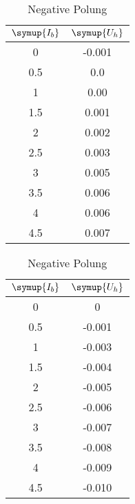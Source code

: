 \vspace{-2cm}

  \begin{table}[!ht]
    \caption*{\textbf{Hallspannung; Strom $\symup{I_q}$ konstant}}
    \begin{minipage}{0.49\textwidth}
          \centering  
          \caption{Positive Polung}
          \label{tab:bconst}
          \begin{tabular}{c c}
            \toprule
            $\symup{I_b}$ & $\symup{U_h}$ \\
            \midrule
             0   & -0.001 \\
             0.5 &  0.0 \\
             1   &  0.00 \\
             1.5 &  0.001 \\
             2   &  0.002 \\
             2.5 &  0.003 \\
             3   &  0.005 \\
             3.5 &  0.006 \\
             4   &  0.006 \\
             4.5 &  0.007 \\
            \bottomrule
        \end{tabular}
    \end{minipage}
    \hfill
    \begin{minipage}{0.49\textwidth}
        \centering
          \caption{Negative Polung}
          \label{tab:bconst-}
           \begin{tabular}{c c}
            \toprule
            $\symup{I_b}$ & $\symup{U_h}$ \\
            \midrule
              0   &  0 \\
             0.5 & -0.001 \\
            1   & -0.003 \\
            1.5 & -0.004 \\
            2   & -0.005 \\
            2.5 & -0.006 \\
            3   & -0.007 \\
            3.5 & -0.008 \\
            4   & -0.009 \\
            4.5 & -0.010 \\
            \bottomrule
       \end{tabular}
     \end{minipage}
  \end{table}

